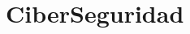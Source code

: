 \chapter{Ciber\+Seguridad }
\hypertarget{md__r_e_a_d_m_e}{}\label{md__r_e_a_d_m_e}
\label{md__r_e_a_d_m_e_autotoc_md0}%
%
